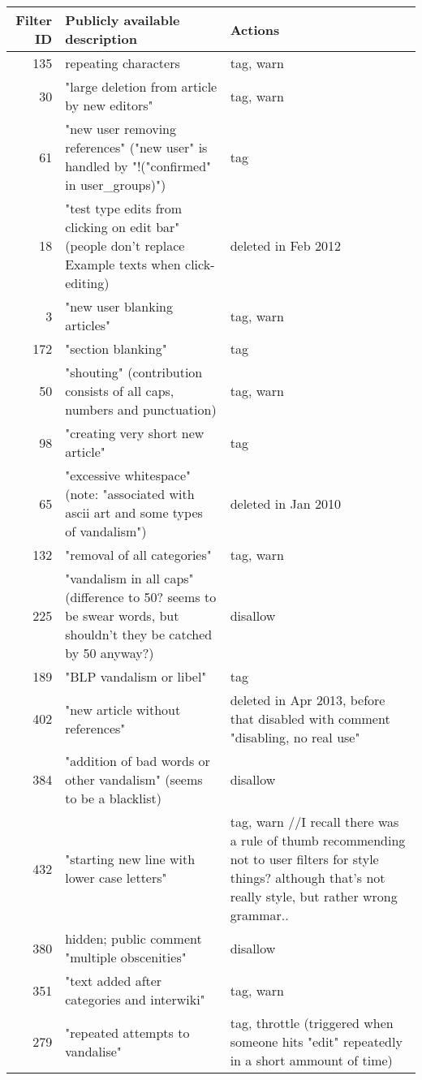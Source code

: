 \begin{table*}
  \centering
    \begin{tabular}{r p{10cm} p{5cm} }
    Filter ID & Publicly available description & Actions \\ %
    \hline
      135 & repeating characters & tag, warn \\
      30 & "large deletion from article by new editors" & tag, warn \\
      61 & "new user removing references" ("new user" is handled by "!("confirmed" in user\_groups)") & tag \\
      18 & "test type edits from clicking on edit bar" (people don't replace Example texts when click-editing) & deleted in Feb 2012 \\
      3 & "new user blanking articles" & tag, warn \\
      172 & "section blanking" & tag \\
      50 & "shouting" (contribution consists of all caps, numbers and punctuation) & tag, warn \\
      98 & "creating very short new article" & tag \\
      65 & "excessive whitespace" (note: "associated with ascii art and some types of vandalism") & deleted in Jan 2010 \\
      132 & "removal of all categories" & tag, warn \\
      225 & "vandalism in all caps" (difference to 50? seems to be swear words, but shouldn't they be catched by 50 anyway?) & disallow \\
      189 & "BLP vandalism or libel" & tag \\
      402 & "new article without references" & deleted in Apr 2013, before that disabled with comment "disabling, no real use" \\
      384 & "addition of bad words or other vandalism" (seems to be a blacklist) & disallow \\
      432 & "starting new line with lower case letters" & tag, warn //I recall there was a rule of thumb recommending not to user filters for style things? although that's not really style, but rather wrong grammar.. \\
      380 & hidden; public comment "multiple obscenities" & disallow \\
      351 & "text added after categories and interwiki" & tag, warn \\
      279 & "repeated attempts to vandalise" & tag, throttle (triggered when someone hits "edit" repeatedly in a short ammount of time) \\

\end{tabular}
\end{table*}
